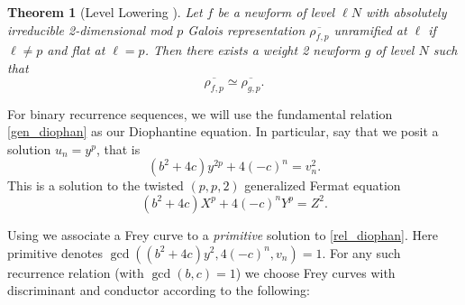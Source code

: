 \documentclass[12pt]{amsart}
\newtheorem{thm}{Theorem}[section]
\theoremstyle{definition}
\renewcommand{\bar}{\overline}
\begin{document}
\begin{thm}[Level Lowering \cite{ribet91}]\label{levellow}
Let $f$ be a newform of level $\ell N$ with absolutely irreducible 2-dimensional mod $p$ Galois representation $\bar{\rho_{f,p}}$ unramified at $\ell$ if $\ell \neq p$ and flat at $\ell = p$.  Then there exists a weight 2 newform $g$ of level $N$ such that
\[ \bar{\rho_{f,p}} \simeq \bar{\rho_{g,p}}. \]
\end{thm}

For binary recurrence sequences, we will use the fundamental relation \eqref{gen_diophan} as our Diophantine equation.  In particular, say that we posit a solution $u_n = y^p$, that is
\begin{equation}\label{rel_diophan} (b^2+4c)y^{2p}+4(-c)^n = v_n^2 .\end{equation}
This is a solution to the twisted $(p,p,2)$ generalized Fermat equation
\[ (b^2+4c)X^p +4(-c)^nY^p = Z^2. \]

Using \cite{bennett04} we associate a Frey curve to a \textit{primitive} solution to \eqref{rel_diophan}.  Here primitive denotes $\gcd((b^2+4c)y^2, 4(-c)^n, v_n ) = 1$.  For any such recurrence relation (with $\gcd(b,c)=1$) we choose Frey curves with discriminant and conductor according to the following:
\end{document}
